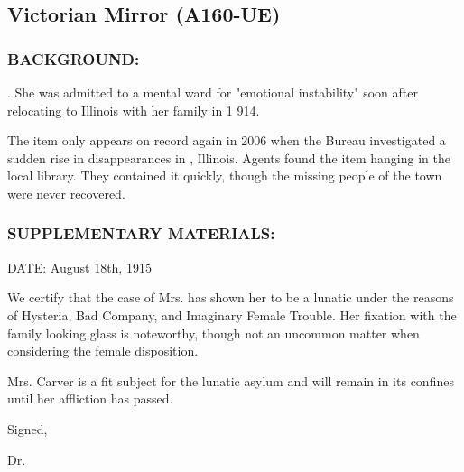 \subsection*{Victorian Mirror (A160-UE)}
\subsubsection*{BACKGROUND:}
\par {}. She was admitted to a mental ward for "emotional instability" soon after
relocating to Illinois with her family in 1 914.
\par The item only appears on record again in 2006 when the Bureau
investigated a sudden rise in disappearances in , Illinois. Agents found the item hanging in the local library. They contained it quickly, though the missing people of the town were
never recovered.
\subsubsection*{SUPPLEMENTARY MATERIALS:}
\par DATE: August 18th, 1915
\par We certify that the case of Mrs.  has shown her to
be a lunatic under the reasons of Hysteria, Bad Company, and
Imaginary Female Trouble. Her fixation with the family looking
glass is noteworthy, though not an uncommon matter when
considering the female disposition.
\par Mrs. Carver is a fit subject for the lunatic asylum and will remain in
its confines until her affliction has passed.
\par Signed,
\par Dr. 